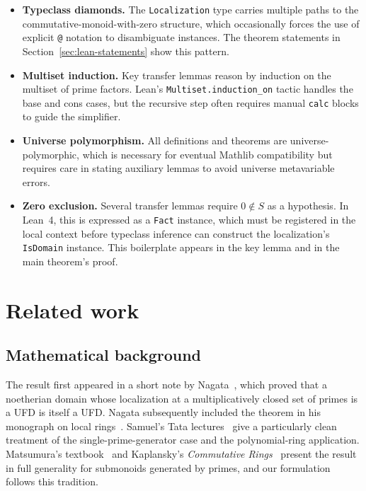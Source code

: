 \documentclass[11pt]{article}
\theoremstyle{plain}
\theoremstyle{definition}
\theoremstyle{remark}
\newcommand{\li}[1]{\texorpdfstring{\texttt{#1}}{#1}}
\begin{document}
\begin{itemize}[nosep]
\item \textbf{Typeclass diamonds.}  The \li{Localization} type carries
  multiple paths to the commutative-monoid-with-zero structure, which
  occasionally forces the use of explicit \li{@} notation to disambiguate
  instances.  The theorem statements in Section~\ref{sec:lean-statements} show
  this pattern.
\item \textbf{Multiset induction.}  Key transfer lemmas reason by induction on
  the multiset of prime factors.  Lean's \li{Multiset.induction\_on} tactic
  handles the base and cons cases, but the recursive step often requires manual
  \li{calc} blocks to guide the simplifier.
\item \textbf{Universe polymorphism.}  All definitions and theorems are
  universe-polymorphic, which is necessary for eventual Mathlib compatibility
  but requires care in stating auxiliary lemmas to avoid universe
  metavariable errors.
\item \textbf{Zero exclusion.}  Several transfer lemmas require $0\notin S$ as
  a hypothesis.  In Lean~4, this is expressed as a \li{Fact} instance, which
  must be registered in the local context before typeclass inference can
  construct the localization's \li{IsDomain} instance.  This boilerplate
  appears in the key lemma and in the main theorem's proof.
\end{itemize}


\section{Related work}\label{sec:related}

\subsection{Mathematical background}

The result first appeared in a short note by Nagata~\cite{nagata1957}, which
proved that a noetherian domain whose localization at a multiplicatively closed
set of primes is a UFD is itself a UFD.  Nagata subsequently included the
theorem in his monograph on local rings~\cite{nagata1962}.  Samuel's Tata
lectures~\cite{samuel1964} give a particularly clean treatment of the
single-prime-generator case and the polynomial-ring application.  Matsumura's
textbook~\cite{matsumura1989} and Kaplansky's \emph{Commutative
Rings}~\cite{kaplansky1970} present the result in full generality for
submonoids generated by primes, and our formulation follows this tradition.
\end{document}
